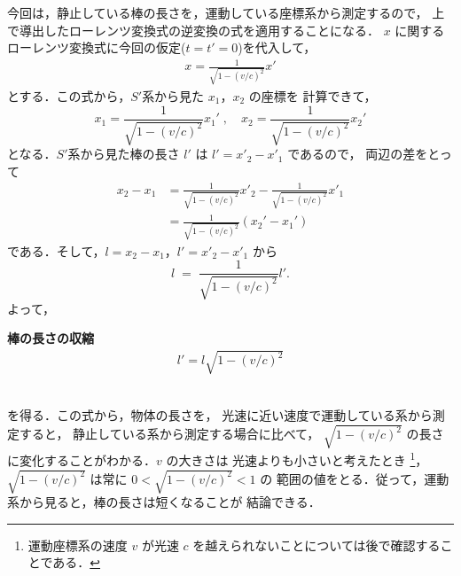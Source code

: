     今回は，静止している棒の長さを，運動している座標系から測定するので，
    上で導出したローレンツ変換式の逆変換の式を適用することになる．
    $x$ に関するローレンツ変換式に今回の仮定($t=t'=0$)を代入して，
        \begin{align}
        x=\frac{1}{\sqrt{ 1-(v/c)^{2} }} x'
        \end{align}
    とする．この式から，$S'$系から見た $x_{1}$，$x_{2}$ の座標を
    計算できて，
        \begin{equation*}
        x_{1}=\frac{1}{\sqrt{ 1-(v/c)^{2} }} x_{1}'
        \;,\quad
        x_{2}=\frac{1}{\sqrt{ 1-(v/c)^{2} }} x_{2}'
        \end{equation*}
    となる．$S'$系から見た棒の長さ $l'$ は $l'=x'_{2}-x'_{1}$ であるので，
    両辺の差をとって
        \begin{align*}
        x_{2}-x_{1} &=\frac{1}{\sqrt{ 1-(v/c)^{2} }} x'_{2}-\frac{1}{\sqrt{ 1-(v/c)^{2} }} x'_{1} \\
                    &=\frac{1}{\sqrt{ 1-(v/c)^{2} }}(x_{2}'-x_{1}')
        \end{align*}
    である．そして，$l=x_{2}-x_{1}$，$l'=x'_{2}-x'_{1}$ から
        \begin{equation*}
        l\;=\;\frac{1}{\sqrt{ 1-(v/c)^{2} }}l'.
        \end{equation*}
    よって，\\
    \begin{itembox}[l]{\textbf{棒の長さの収縮}}
        \begin{align}
        l'=l\sqrt{ 1-(v/c)^{2} }
        \end{align}
    \end{itembox}\\
    を得る．この式から，物体の長さを，
    光速に近い速度で運動している系から測定すると，
    静止している系から測定する場合に比べて，
    $\sqrt{ 1-(v/c)^{2} }$ の長さに変化することがわかる．$v$ の大きさは
    光速よりも小さいと考えたとき
    \footnote{
        運動座標系の速度 $v$ が光速 $c$ を越えられないことについては後で確認することである．
    }，
    $\sqrt{ 1-(v/c)^{2} }$ は常に $0<\sqrt{ 1-(v/c)^{2} }<1$ の
    範囲の値をとる．従って，運動系から見ると，棒の長さは短くなることが
    結論できる．

